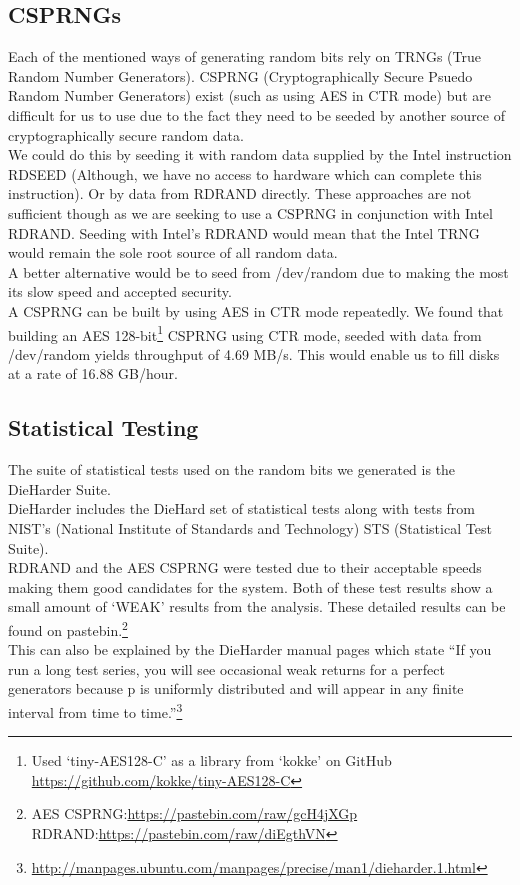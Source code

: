\documentclass{paper}
\begin{document}
		\subsection{CSPRNGs}
			Each of the mentioned ways of generating random bits rely on TRNGs (True Random Number Generators).  CSPRNG (Cryptographically Secure Psuedo Random Number Generators) exist (such as using AES in CTR mode) but are difficult for us to use due to the fact they need 
			to be seeded by another source of cryptographically secure random data.\\ 
			We could do this by seeding it with random data supplied by the Intel instruction RDSEED (Although, we have no access to hardware which can complete this instruction). Or by data from RDRAND directly. These approaches are not sufficient though as we are seeking to use a CSPRNG in conjunction with Intel RDRAND. Seeding with Intel's RDRAND would mean that the Intel TRNG would remain 	the sole root source of all random data.\\
			A better alternative would be to seed from /dev/random due to making the most its slow speed and accepted security.\\
			
			A CSPRNG can be built by using AES in CTR mode repeatedly. We found that building an AES 128-bit\footnote{Used `tiny-AES128-C' as a library from `kokke' on GitHub \url{https://github.com/kokke/tiny-AES128-C}} CSPRNG using CTR mode, seeded with data from /dev/random yields throughput of 4.69 MB/s. This would enable us to fill disks at a rate of 16.88 GB/hour. 
			
		\subsection{Statistical Testing}
			The suite of statistical tests used on the random bits we generated is the DieHarder Suite.\\ 
			DieHarder includes the DieHard set of statistical tests along with tests from NIST's (National Institute of Standards and Technology) STS (Statistical Test Suite).\\ 
			RDRAND and the AES CSPRNG were tested due to their acceptable speeds making them good candidates for the system. Both of these test results show a small amount of `WEAK' results from the analysis. These detailed results can be found on pastebin.\footnote{AES CSPRNG:\url{https://pastebin.com/raw/gcH4jXGp} RDRAND:\url{https://pastebin.com/raw/diEgthVN}}\\
			This can also be explained by the DieHarder manual pages which state ``If you run a long test series, you will see occasional weak returns for a perfect generators because p is uniformly distributed and will appear in any finite interval from time to time.''\footnote{\url{http://manpages.ubuntu.com/manpages/precise/man1/dieharder.1.html}}
			
\end{document}
